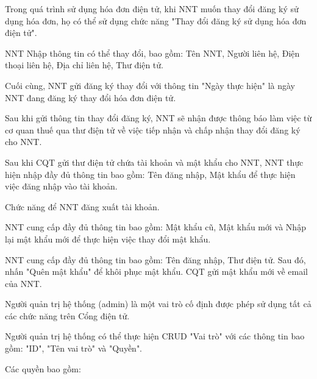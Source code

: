 


Trong quá trình sử dụng hóa đơn điện tử, khi NNT muốn thay đổi đăng ký sử dụng hóa đơn, họ có thể sử dụng chức năng "Thay đổi đăng ký sử dụng hóa đơn điện tử".

NNT Nhập thông tin có thể thay đổi, bao gồm: Tên NNT, Người liên hệ, Điện thoại liên hệ, Địa chỉ liên hệ, Thư điện tử.

Cuối cùng, NNT gửi đăng ký thay đổi với thông tin "Ngày thực hiện" là ngày NNT đang đăng ký thay đổi hóa đơn điện tử.

Sau khi gửi thông tin thay đổi đăng ký, NNT sẽ nhận được thông báo làm việc từ cơ quan thuế qua thư điện tử về việc tiếp nhận và chấp nhận thay đổi đăng ký cho NNT.


Sau khi CQT gửi thư điện tử chứa tài khoản và mật khẩu cho NNT, NNT thực hiện nhập đầy đủ thông tin bao gồm: Tên đăng nhập, Mật khẩu để thực hiện việc đăng nhập vào tài khoản.


Chức năng để NNT đăng xuất tài khoản.


NNT cung cấp đầy đủ thông tin bao gồm: Mật khẩu cũ, Mật khẩu mới và Nhập lại mật khẩu mới để thực hiện việc thay đổi mật khẩu.


NNT cung cấp đầy đủ thông tin bao gồm: Tên đăng nhập, Thư điện tử. Sau đó, nhấn "Quên mật khẩu" để khôi phục mật khẩu. CQT gửi mật khẩu mới về email của NNT.



Người quản trị hệ thống (admin) là một vai trò cố định được phép sử dụng tất cả các chức năng trên Cổng điện tử.

Người quản trị hệ thống có thể thực hiện CRUD "Vai trò" với các thông tin bao gồm: "ID", "Tên vai trò" và "Quyền".

Các quyền bao gồm:

